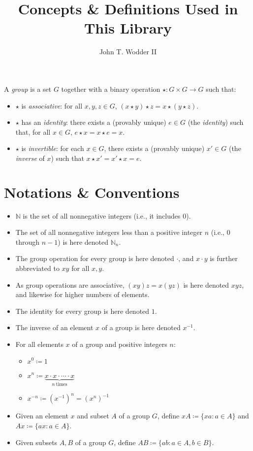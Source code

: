 \documentclass{article}
\title{Concepts \& Definitions Used in This Library}
\author{John T. Wodder II}
\newcommand{\N}{\mathbb{N}}
\begin{document}
\maketitle

A \emph{group} is a set $G$ together with a binary operation $\star\colon G\times G\to G$ such that:
\begin{itemize}
\item $\star$ is \emph{associative}: for all $x,y,z\in G$, $(x\star y)\star z = x\star(y\star z)$.
\item $\star$ has an \emph{identity}: there exists a (provably unique) $e\in G$ (the \emph{identity}) such that, for all $x\in G$, $e\star x = x\star e = x$.
\item $\star$ is \emph{invertible}: for each $x\in G$, there exists a (provably unique) $x'\in G$ (the \emph{inverse} of $x$) such that $x\star x' = x'\star x = e$.
\end{itemize}


\section{Notations \& Conventions}
\begin{itemize}
\item $\N$ is the set of all nonnegative integers (i.e., it includes 0).
\item The set of all nonnegative integers less than a positive integer $n$ (i.e., 0 through $n-1$) is here denoted $\N_n$.
\item The group operation for every group is here denoted $\cdot$, and $x\cdot y$ is further abbreviated to $xy$ for all $x,y$.
\item As group operations are associative, $(xy)z = x(yz)$ is here denoted $xyz$, and likewise for higher numbers of elements.
\item The identity for every group is here denoted $1$.
\item The inverse of an element $x$ of a group is here denoted $x^{-1}$.
\item For all elements $x$ of a group and positive integers $n$:
 \begin{itemize}
 \item $x^0 \coloneqq 1$
 \item $x^n \coloneqq \underbrace{x\cdot x\cdot\cdots\cdot x}_{n\ \mathrm{times}}$
 \item $x^{-n} \coloneqq (x^{-1})^n = (x^n)^{-1}$
 \end{itemize}
\item Given an element $x$ and subset $A$ of a group $G$, define $xA \coloneqq \{xa : a\in A\}$ and $Ax\coloneqq \{ax : a\in A\}$.
\item Given subsets $A,B$ of a group $G$, define $AB\coloneqq\{ab : a\in A, b\in B\}$.
\end{itemize}
\end{document}
